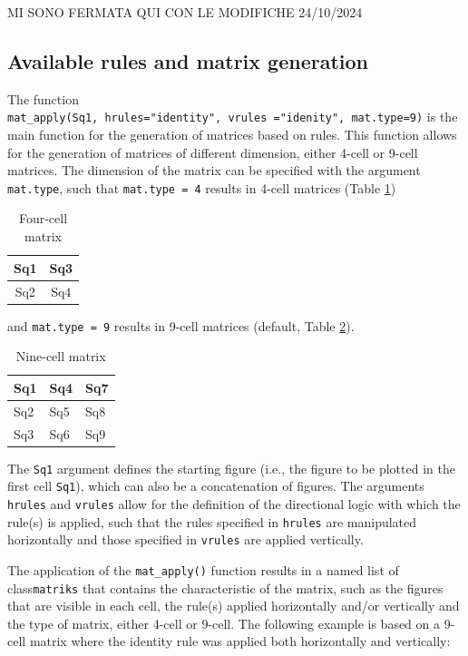 MI SONO FERMATA QUI CON LE MODIFICHE 24/10/2024

\subsection{Available rules and matrix generation}\label{available-rules-and-matrix-generation}

The function \texttt{mat\_apply(Sq1,\ hrules="identity",\ vrules\ ="idenity",\ mat.type=9)} is the main function for the generation of matrices based on rules.
This function allows for the generation of matrices of different dimension, either 4-cell or 9-cell matrices.
The dimension of the matrix can be specified with the argument \texttt{mat.type}, such that \texttt{mat.type\ =\ 4} results in 4-cell matrices (Table \ref{tab:fourCell-static})

\begin{table}

\caption{\label{tab:fourCell-static}Four-cell matrix}
\centering
\begin{tabular}[t]{c|c}
\hline
Sq1 & Sq3\\
\hline
Sq2 & Sq4\\
\hline
\end{tabular}
\end{table}

and \texttt{mat.type\ =\ 9} results in 9-cell matrices (default, Table \ref{tab:nineCell-static}).

\begin{table}

\caption{\label{tab:nineCell-static}Nine-cell matrix}
\centering
\begin{tabular}[t]{l|l|l}
\hline
Sq1 & Sq4 & Sq7\\
\hline
Sq2 & Sq5 & Sq8\\
\hline
Sq3 & Sq6 & Sq9\\
\hline
\end{tabular}
\end{table}

The \texttt{Sq1} argument defines the starting figure (i.e., the figure to be plotted in the first cell \texttt{Sq1}), which can also be a concatenation of figures. The arguments \texttt{hrules} and \texttt{vrules} allow for the definition of the directional logic with which the rule(s) is applied, such that the rules specified in \texttt{hrules} are manipulated horizontally and those specified in \texttt{vrules} are applied vertically.

The application of the \texttt{mat\_apply()} function results in a named list of class\texttt{matriks} that contains the characteristic of the matrix, such as the figures that are visible in each cell, the rule(s) applied horizontally and/or vertically and the type of matrix, either 4-cell or 9-cell. The following example is based on a 9-cell matrix where the identity rule was applied both horizontally and vertically:

